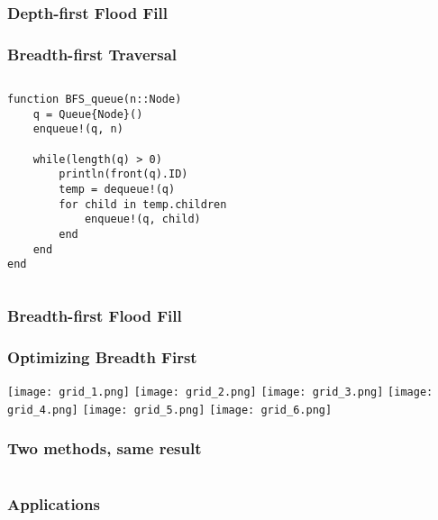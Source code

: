 \documentclass{beamer}
\begin{document}
\begin{frame}[fragile]
\frametitle{Depth-first Flood Fill}
\center {}

\end{frame}

\begin{frame}[fragile]
\frametitle{Breadth-first Traversal}
\begin{columns}
\begin{lstlisting}
function BFS_queue(n::Node)
    q = Queue{Node}()
    enqueue!(q, n)

    while(length(q) > 0)
        println(front(q).ID)
        temp = dequeue!(q)
        for child in temp.children
            enqueue!(q, child)
        end
    end
end
\end{lstlisting}
\end{columns}
\end{frame}

\begin{frame}
\frametitle{Breadth-first Flood Fill}
\center {}
\end{frame}

\begin{frame}
\frametitle{Optimizing Breadth First}
\begin{overprint}
 \center \texttt{[image: grid\_1.png]}
 \center \texttt{[image: grid\_2.png]}
 \center \texttt{[image: grid\_3.png]}
 \center \texttt{[image: grid\_4.png]}
 \center \texttt{[image: grid\_5.png]}
 \center \texttt{[image: grid\_6.png]}
\end{overprint}
\end{frame}

\begin{frame}
\frametitle{Two methods, same result}
\begin{columns}
\end{columns}
\end{frame}

\begin{frame}
\frametitle{Applications}
\center {}
\end{frame}
\end{document}
